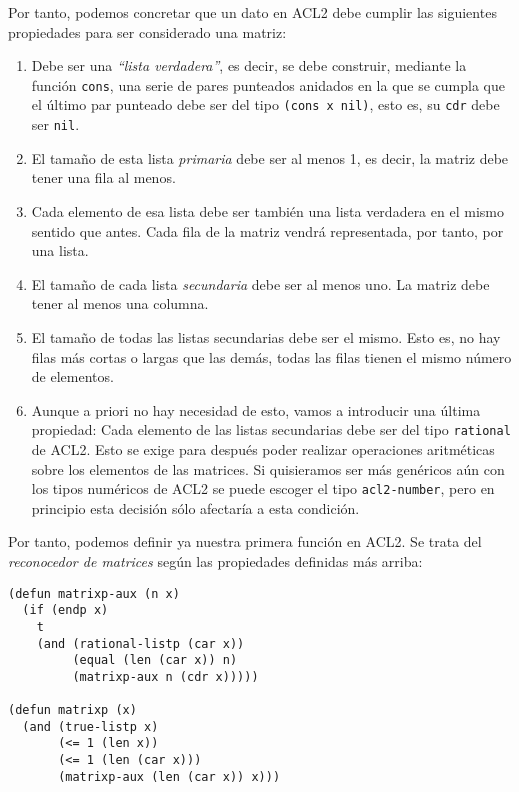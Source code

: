 \documentclass[a4paper,10pt]{article}
\begin{document}
\par \vspace{10pt}

Por tanto, podemos concretar que un dato en ACL2 debe cumplir las siguientes propiedades para ser considerado una matriz:

\begin{enumerate}
	\item Debe ser una \emph{``lista verdadera''}, es decir, se debe construir, mediante la función \texttt{cons}, una serie de pares punteados anidados en la que se cumpla que el último par punteado debe ser del tipo \texttt{(cons x nil)}, esto es, su \texttt{cdr} debe ser \texttt{nil}.
	\item El tamaño de esta lista \emph{primaria} debe ser al menos 1, es decir, la matriz debe tener una fila al menos.
	\item Cada elemento de esa lista debe ser también una lista verdadera en el mismo sentido que antes. Cada fila de la matriz vendrá representada, por tanto, por una lista.
	\item El tamaño de cada lista \emph{secundaria} debe ser al menos uno. La matriz debe tener al menos una columna.
	\item El tamaño de todas las listas secundarias debe ser el mismo. Esto es, no hay filas más cortas o largas que las demás, todas las filas tienen el mismo número de elementos.
	\item Aunque a priori no hay necesidad de esto, vamos a introducir una última propiedad: Cada elemento de las listas secundarias debe ser del tipo \texttt{rational} de ACL2. Esto se exige para después poder realizar operaciones aritméticas sobre los elementos de las matrices. Si quisieramos ser más genéricos aún con los tipos numéricos de ACL2 se puede escoger el tipo \texttt{acl2-number}, pero en principio esta decisión sólo afectaría a esta condición.
\end{enumerate}

\par \vspace{10pt}

Por tanto, podemos definir ya nuestra primera función en ACL2. Se trata del \emph{reconocedor de matrices} según las propiedades definidas más arriba:

\begin{lstlisting}[language=clips]
(defun matrixp-aux (n x)
  (if (endp x)
    t
    (and (rational-listp (car x))
         (equal (len (car x)) n)
         (matrixp-aux n (cdr x)))))

(defun matrixp (x)
  (and (true-listp x)
       (<= 1 (len x))
       (<= 1 (len (car x)))
       (matrixp-aux (len (car x)) x)))
\end{lstlisting}
\end{document}
